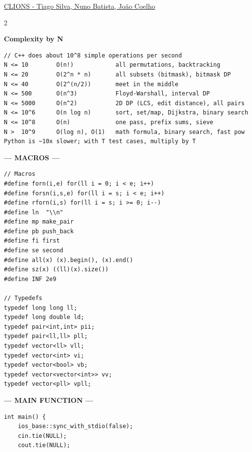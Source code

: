 \documentclass{article}
\begin{document}
\raggedright
\footnotesize

\begin{center}
     \large{\underline{CLIONS - Tiago Silva, Nuno Batista, João Coelho}} \\
\end{center}

\begin{multicols}{2}

\large
\Large\textbf{Complexity by N}
\large
\begin{lstlisting}[columns=fixed]
// C++ does about 10^8 simple operations per second
N <= 10        O(n!)            all permutations, backtracking
N <= 20        O(2^n * n)       all subsets (bitmask), bitmask DP
N <= 40        O(2^(n/2))       meet in the middle
N <= 500       O(n^3)           Floyd-Warshall, interval DP
N <= 5000      O(n^2)           2D DP (LCS, edit distance), all pairs
N <= 10^6      O(n log n)       sort, set/map, Dijkstra, binary search
N <= 10^8      O(n)             one pass, prefix sums, sieve
N >  10^9      O(log n), O(1)   math formula, binary search, fast pow
Python is ~10x slower; with T test cases, multiply by T
\end{lstlisting}

\large
\begin{center}
\huge\textbf{--- MACROS ---}
\end{center}
\large
\begin{lstlisting}
// Macros
#define forn(i,e) for(ll i = 0; i < e; i++)
#define forsn(i,s,e) for(ll i = s; i < e; i++)
#define rforn(i,s) for(ll i = s; i >= 0; i--)
#define ln  "\\n"
#define mp make_pair
#define pb push_back
#define fi first
#define se second
#define all(x) (x).begin(), (x).end()
#define sz(x) ((ll)(x).size())
#define INF 2e9

// Typedefs
typedef long long ll;
typedef long double ld;
typedef pair<int,int> pii;
typedef pair<ll,ll> pll;
typedef vector<ll> vll;
typedef vector<int> vi;
typedef vector<bool> vb;
typedef vector<vector<int>> vv;
typedef vector<pll> vpll;
\end{lstlisting}

\large
\begin{center}
\huge\textbf{--- MAIN FUNCTION ---}
\end{center}
\large
\begin{lstlisting}
int main() {
    ios_base::sync_with_stdio(false);
    cin.tie(NULL); 
    cout.tie(NULL);


\end{lstlisting}
\end{multicols}
\end{document}
